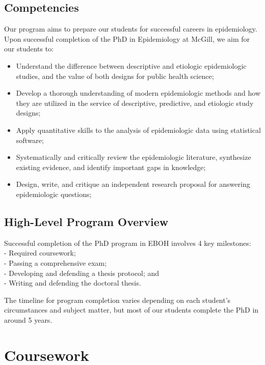 \documentclass[
]{book}
\providecommand{\tightlist}{%
  \setlength{\itemsep}{0pt}\setlength{\parskip}{0pt}}
\begin{document}
\hypertarget{competencies}{%
\section{Competencies}\label{competencies}}

Our program aims to prepare our students for successful careers in epidemiology. Upon successful completion of the PhD in Epidemiology at McGill, we aim for our students to:

\begin{itemize}
\tightlist
\item
  Understand the difference between descriptive and etiologic epidemiologic studies, and the value of both designs for public health science;
\item
  Develop a thorough understanding of modern epidemiologic methods and how they are utilized in the service of descriptive, predictive, and etiologic study designs;
\item
  Apply quantitative skills to the analysis of epidemiologic data using statistical software;
\item
  Systematically and critically review the epidemiologic literature, synthesize existing evidence, and identify important gaps in knowledge;
\item
  Design, write, and critique an independent research proposal for answering epidemiologic questions;
\end{itemize}

\hypertarget{high-level-program-overview}{%
\section{High-Level Program Overview}\label{high-level-program-overview}}

Successful completion of the PhD program in EBOH involves 4 key milestones:\\
- Required coursework;\\
- Passing a comprehensive exam;\\
- Developing and defending a thesis protocol; and\\
- Writing and defending the doctoral thesis.

The timeline for program completion varies depending on each student's circumstances and subject matter, but most of our students complete the PhD in around 5 years.

\hypertarget{coursework}{%
\chapter{Coursework}\label{coursework}}
\end{document}
